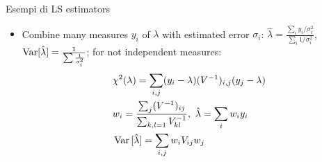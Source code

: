\documentclass[asd-beamer.tex]{subfiles}%
\begin{document}
\begin{frame}{Esempi di LS estimators}
\begin{itemize}
\item Combine many measures $y_i$ of $\lambda$ with estimated error $\sigma_i$: $\hat{\lambda}=\frac{\sum_iy_i/\sigma_i^2}{\sum_i1/\sigma_i^2}$, $\operatorname{Var}[\hat{\lambda}]=\frac{1}{\sum\frac{1}{\sigma_i^2}}$; for not independent measures:
\begin{align*}
&\chi^2(\lambda)=\sum_{i,j}(y_i-\lambda)(\invers{V})_{i,j}(y_j-\lambda)\\
&w_i=\frac{\sum_j(\invers{V})_{ij}}{\sum_{k,l=1}\invers{V}_{kl}},\ \hat{\lambda}=\sum_iw_iy_i\\
&\var{[\hat{\lambda}]}=\sum_{i,j}w_iV_{ij}w_j
\end{align*}
\end{itemize}
\end{frame}
\end{document}
